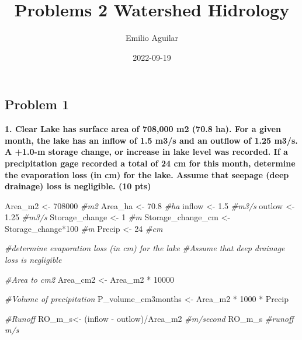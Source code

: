 \documentclass[
]{article}
\title{Problems 2 Watershed Hidrology}
\author{Emilio Aguilar}
\date{2022-09-19}
\newenvironment{Shaded}{\begin{snugshade}}{\end{snugshade}}
\newcommand{\CommentTok}[1]{\textcolor[rgb]{0.56,0.35,0.01}{\textit{#1}}}
\newcommand{\DecValTok}[1]{\textcolor[rgb]{0.00,0.00,0.81}{#1}}
\newcommand{\FloatTok}[1]{\textcolor[rgb]{0.00,0.00,0.81}{#1}}
\newcommand{\NormalTok}[1]{#1}
\newcommand{\OtherTok}[1]{\textcolor[rgb]{0.56,0.35,0.01}{#1}}
\newcommand{\SpecialCharTok}[1]{\textcolor[rgb]{0.00,0.00,0.00}{#1}}
\begin{document}
\maketitle

\hypertarget{problem-1}{%
\subsection{Problem 1}\label{problem-1}}

\textbf{1. Clear Lake has surface area of 708,000 m2 (70.8 ha). For a
given month, the lake has an inflow of 1.5 m3/s and an outflow of 1.25
m3/s. A +1.0-m storage change, or increase in lake level was recorded.
If a precipitation gage recorded a total of 24 cm for this month,
determine the evaporation loss (in cm) for the lake. Assume that seepage
(deep drainage) loss is negligible. (10 pts)}

\begin{Shaded}
\begin{Highlighting}[]
\NormalTok{Area\_m2 }\OtherTok{\textless{}{-}} \DecValTok{708000} \CommentTok{\#m2}
\NormalTok{Area\_ha }\OtherTok{\textless{}{-}} \FloatTok{70.8} \CommentTok{\#ha}
\NormalTok{inflow }\OtherTok{\textless{}{-}} \FloatTok{1.5} \CommentTok{\#m3/s}
\NormalTok{outlow }\OtherTok{\textless{}{-}} \FloatTok{1.25} \CommentTok{\#m3/s}
\NormalTok{Storage\_change }\OtherTok{\textless{}{-}} \DecValTok{1} \CommentTok{\#m}
\NormalTok{Storage\_change\_cm }\OtherTok{\textless{}{-}}\NormalTok{ Storage\_change}\SpecialCharTok{*}\DecValTok{100} \CommentTok{\#m}
\NormalTok{Precip }\OtherTok{\textless{}{-}} \DecValTok{24} \CommentTok{\#cm}

\CommentTok{\#determine evaporation loss (in cm) for the lake}
\CommentTok{\#Assume that deep drainage loss is negligible }

\CommentTok{\#Area to cm2}
\NormalTok{Area\_cm2 }\OtherTok{\textless{}{-}}\NormalTok{ Area\_m2 }\SpecialCharTok{*} \DecValTok{10000}

\CommentTok{\#Volume of precipitation}
\NormalTok{P\_volume\_cm3months }\OtherTok{\textless{}{-}}\NormalTok{ Area\_m2 }\SpecialCharTok{*} \DecValTok{1000} \SpecialCharTok{*}\NormalTok{ Precip}

\CommentTok{\#Runoff}
\NormalTok{RO\_m\_s}\OtherTok{\textless{}{-}}\NormalTok{ (inflow }\SpecialCharTok{{-}}\NormalTok{ outlow)}\SpecialCharTok{/}\NormalTok{Area\_m2 }\CommentTok{\#m/second}
\NormalTok{RO\_m\_s }\CommentTok{\#runoff m/s}
\end{Highlighting}
\end{Shaded}
\end{document}
